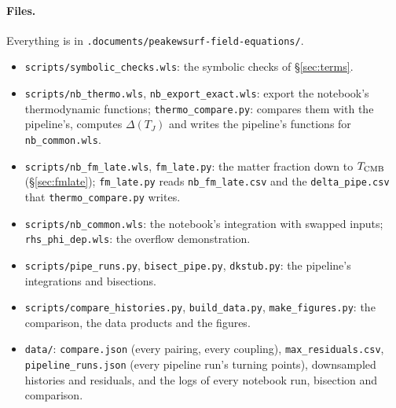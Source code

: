 \documentclass[11pt,a4paper]{article}
\newcommand{\TJ}{T_{J}}
\newcommand{\code}[1]{\texttt{#1}}
\begin{document}
\paragraph{Files.} Everything is in \code{.documents/peakewsurf-field-equations/}.
\begin{itemize}
\item \code{scripts/symbolic\_checks.wls}: the symbolic checks of \S\ref{sec:terms}.
\item \code{scripts/nb\_thermo.wls}, \code{nb\_export\_exact.wls}: export the notebook's
  thermodynamic functions; \code{thermo\_compare.py}: compares them with the pipeline's, computes
  $\Delta(\TJ)$ and writes the pipeline's functions for \code{nb\_common.wls}.
\item \code{scripts/nb\_fm\_late.wls}, \code{fm\_late.py}: the matter fraction down to
  $T_{\rm CMB}$ (\S\ref{sec:fmlate}); \code{fm\_late.py} reads \code{nb\_fm\_late.csv} and the
  \code{delta\_pipe.csv} that \code{thermo\_compare.py} writes.
\item \code{scripts/nb\_common.wls}: the notebook's integration with swapped inputs;
  \code{rhs\_phi\_dep.wls}: the overflow demonstration.
\item \code{scripts/pipe\_runs.py}, \code{bisect\_pipe.py}, \code{dkstub.py}: the pipeline's
  integrations and bisections.
\item \code{scripts/compare\_histories.py}, \code{build\_data.py}, \code{make\_figures.py}:
  the comparison, the data products and the figures.
\item \code{data/}: \code{compare.json} (every pairing, every coupling), \code{max\_residuals.csv},
  \code{pipeline\_runs.json} (every pipeline run's turning points), downsampled histories and
  residuals, and the logs of every notebook run, bisection and comparison.
\end{itemize}
\end{document}
